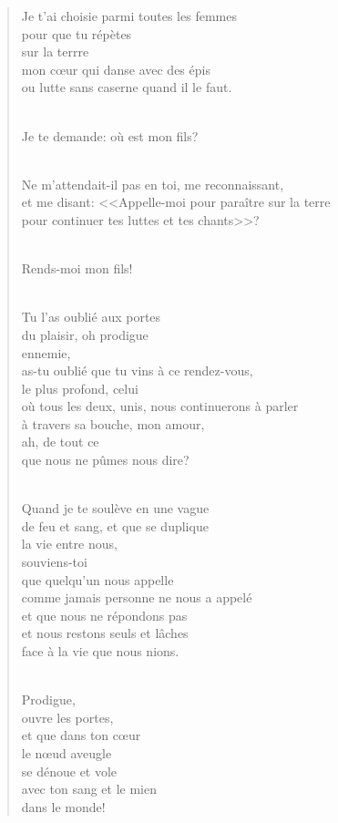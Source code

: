 \documentclass[11pt,a4paper]{book}
\begin{document}
\begin{verse}
Je t'ai choisie parmi toutes les femmes \\
pour que tu répètes \\
sur la terrre \\
mon c{\oe}ur qui danse avec des épis \\
ou lutte sans caserne quand il le faut. \\ \

Je te demande: où est mon fils? \\ \

Ne m'attendait-il pas en toi, me reconnaissant, \\
et me disant: <<Appelle-moi pour paraître sur la terre \\
pour continuer tes luttes et tes chants>>? \\ \

Rends-moi mon fils! \\ \

Tu l'as oublié aux portes \\
du plaisir, oh prodigue \\
ennemie, \\
as-tu oublié que tu vins à ce rendez-vous, \\
le plus profond, celui \\
où tous les deux, unis, nous continuerons à parler \\
à travers sa bouche, mon amour, \\
ah, de tout ce \\
que nous ne pûmes nous dire? \\ \

Quand je te soulève en une vague \\
de feu et sang, et que se duplique \\
la vie entre nous, \\
souviens-toi \\
que quelqu'un nous appelle \\
comme jamais personne ne nous a appelé \\
et que nous ne répondons pas \\
et nous restons seuls et lâches \\
face à la vie que nous nions. \\ \

Prodigue, \\
ouvre les portes, \\
et que dans ton c{\oe}ur \\
le n{\oe}ud aveugle \\
se dénoue et vole \\
avec ton sang et le mien \\
dans le monde!
\end{verse}
\end{document}
